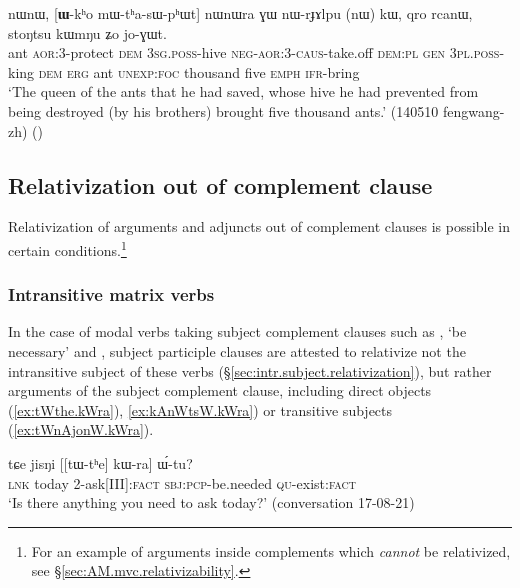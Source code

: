 \begin{exe}
\ex \label{ex:Wkho.mWthasWphWt}
 nɯnɯ, [\textbf{ɯ}-kʰo mɯ-tʰa-sɯ-pʰɯt] nɯnɯra ɣɯ nɯ-rɟɤlpu (nɯ) kɯ, qro rcanɯ, stoŋtsu kɯmŋu ʑo jo-ɣɯt. \\
ant \textsc{aor}:3\flobv{}-protect \textsc{dem} \textsc{3sg}.\textsc{poss}-hive \textsc{neg}-\textsc{aor}:3\flobv{}-\textsc{caus}-take.off \textsc{dem}:\textsc{pl} \textsc{gen} \textsc{3pl}.\textsc{poss}-king \textsc{dem} \textsc{erg} ant \textsc{unexp}:\textsc{foc} thousand five \textsc{emph} \textsc{ifr}-bring \\
\glt `The queen of the ants that he had saved, whose hive he had prevented from being destroyed (by his brothers) brought five thousand ants.' (140510 fengwang-zh)
()
\end{exe}

  
 
 
\subsection{Relativization out of complement clause} \label{sec:out.complement.relativization}
Relativization of arguments and adjuncts out of complement clauses is possible in certain conditions.\footnote{For an example of arguments  inside complements which \textit{cannot} be relativized, see §\ref{sec:AM.mvc.relativizability}.  }

\subsubsection{Intransitive matrix verbs}  \label{sec:out.complement.relativization.intr}
In the case of modal verbs taking subject complement clauses such as , `be necessary' and ,  subject participle clauses are attested to relativize not the intransitive subject of these verbs (§\ref{sec:intr.subject.relativization}), but rather arguments of the subject complement clause, including direct objects (\ref{ex:tWthe.kWra}), \ref{ex:kAnWtsW.kWra}) or transitive subjects (\ref{ex:tWnAjonW.kWra}).

\begin{exe}
\ex \label{ex:tWthe.kWra}
\gll tɕe jisŋi [[tɯ-tʰe] kɯ-ra] ɯ́-tu? \\
\textsc{lnk} today 2-ask[III]:\textsc{fact} \textsc{sbj}:\textsc{pcp}-be.needed \textsc{qu}-exist:\textsc{fact} \\
\glt `Is there anything you need to ask today?' (conversation 17-08-21)
\end{exe}

